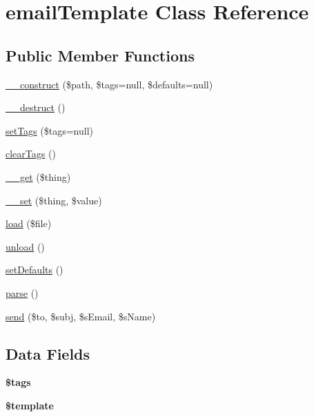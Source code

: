 \hypertarget{classemail_template}{\section{email\-Template Class Reference}
\label{classemail_template}
}
\subsection*{Public Member Functions}
\begin{DoxyCompactItemize}
\item 
\hyperlink{classemail_template_a4d8e4a324efce73096d5af1d4c143fdd}{\-\_\-\-\_\-construct} (\$path, \$tags=null, \$defaults=null)
\item 
\hyperlink{classemail_template_a421831a265621325e1fdd19aace0c758}{\-\_\-\-\_\-destruct} ()
\item 
\hyperlink{classemail_template_a182cb7b16d045c4aa1cbf6e0cd845933}{set\-Tags} (\$tags=null)
\item 
\hyperlink{classemail_template_a66517013fef49505b145d9f8bccfa6d3}{clear\-Tags} ()
\item 
\hyperlink{classemail_template_aa36766cc96e8ead6a654535cd826cc92}{\-\_\-\-\_\-get} (\$thing)
\item 
\hyperlink{classemail_template_a1e08cf354600b2e56e93bd4f59636937}{\-\_\-\-\_\-set} (\$thing, \$value)
\item 
\hyperlink{classemail_template_aaa4e95f27857ab78defda3e0c0b7039b}{load} (\$file)
\item 
\hyperlink{classemail_template_aa13d0535d22492ba710e3419a7b92ac1}{unload} ()
\item 
\hyperlink{classemail_template_ac900283b8780520c328c6457e34177f4}{set\-Defaults} ()
\item 
\hyperlink{classemail_template_a38d99acc70a1d8fd8f94455743b2d237}{parse} ()
\item 
\hyperlink{classemail_template_a7be7ce516e2b409907f824e06957b923}{send} (\$to, \$subj, \$s\-Email, \$s\-Name)
\end{DoxyCompactItemize}
\subsection*{Data Fields}
\begin{DoxyCompactItemize}
\item 
\hypertarget{classemail_template_a475a6a63b85186663d34151bcbd21590}{{\bfseries \$tags}}\label{classemail_template_a475a6a63b85186663d34151bcbd21590}

\item 
\hypertarget{classemail_template_aa3e9534005fd516d941f6a5569896e01}{{\bfseries \$template}}\label{classemail_template_aa3e9534005fd516d941f6a5569896e01}

\end{DoxyCompactItemize}
